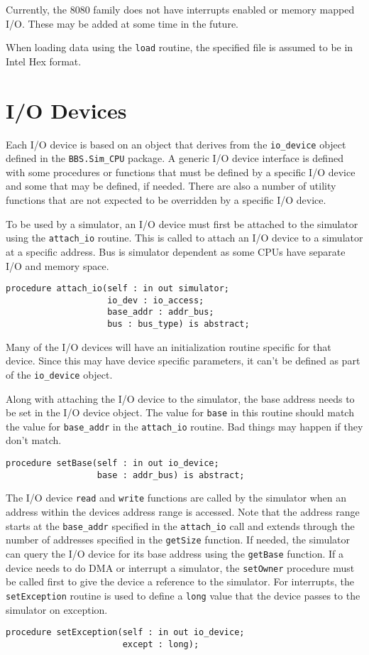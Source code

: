\documentclass[10pt, openany]{book}
\newcommand{\package}[1]{\texttt{#1}}
\newcommand{\function}[1]{\texttt{#1}}
\newcommand{\keyword}[1]{\texttt{#1}}
\newcommand{\datatype}[1]{\texttt{#1}}
\begin{document}
Currently, the 8080 family does not have interrupts enabled or memory mapped I/O.  These may be added at some time in the future.

When loading data using the \function{load} routine, the specified file is assumed to be in Intel Hex format.

\chapter{I/O Devices}
\label{chap:IODev}
Each I/O device is based on an object that derives from the \datatype{io\_device} object defined in the \package{BBS.Sim\_CPU} package.  A generic I/O device interface is defined with some procedures or functions that must be defined by a specific I/O device and some that may be defined, if needed.  There are also a number of utility functions that are not expected to be overridden by a specific I/O device.

To be used by a simulator, an I/O device must first be attached to the simulator using the \function{attach\_io} routine.  This is called to attach an I/O device to a simulator at a specific address.  Bus is simulator dependent as some CPUs have separate I/O and memory space.
\begin{lstlisting}
procedure attach_io(self : in out simulator;
                    io_dev : io_access;
                    base_addr : addr_bus;
                    bus : bus_type) is abstract;
\end{lstlisting}

Many of the I/O devices will have an initialization routine specific for that device.  Since this may have device specific parameters, it can't be defined as part of the \datatype{io\_device} object.

Along with attaching the I/O device to the simulator, the base address needs to be set in the I/O device object.  The value for \keyword{base} in this routine should match the value for \keyword{base\_addr} in the \function{attach\_io} routine.  Bad things may happen if they don't match.
\begin{lstlisting}
procedure setBase(self : in out io_device;
                  base : addr_bus) is abstract;
\end{lstlisting}

The I/O device \verb|read| and \verb|write| functions are called by the simulator when an address within the devices address range is accessed.  Note that the address range starts at the \verb|base_addr| specified in the \verb|attach_io| call and extends through the number of addresses specified in the \verb|getSize| function.  If needed, the simulator can query the I/O device for its base address using the \verb|getBase| function.  If a device needs to do DMA or interrupt a simulator, the \verb|setOwner| procedure must be called first to give the device a reference to the simulator.  For interrupts, the \verb|setException| routine is used to define a \verb|long| value that the device passes to the simulator on exception.
\begin{lstlisting}
procedure setException(self : in out io_device;
                       except : long);
\end{lstlisting}
\end{document}
